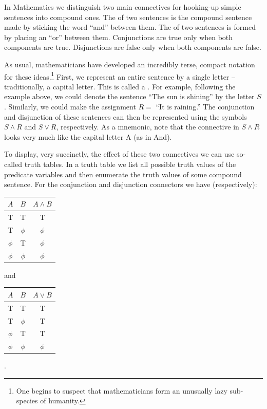 In Mathematics we distinguish two main connectives for hooking-up simple
sentences into compound ones.  The  
of two sentences is
the compound sentence made by sticking the word ``and'' between them.
The  of two sentences is 
formed by placing an ``or'' 
between them.  Conjunctions are true only when both components are true.
Disjunctions are false only when both components are false.


As usual, mathematicians have developed an incredibly terse, compact
notation for these ideas.\footnote{One begins to suspect that %
mathematicians form an unusually lazy sub-species of humanity.}  
First, we represent an
entire sentence by a single letter -- traditionally, a capital letter.  
This is called a .
For example, following the example above, we could denote the sentence
``The sun is shining'' by the letter $S$.   Similarly, we could make the
assignment $R =$ ``It is raining.''   The conjunction and disjunction 
of these sentences can then be represented using the symbols $S \land R$
and $S \lor R$, respectively.  As a mnemonic, note that the connective
in $S \land R$ looks very much like the capital letter A (as in And).

To display, very succinctly, the effect of these two connectives we can
use so-called truth tables. In a truth table we list 
all possible truth 
values of the predicate variables and then enumerate the truth values 
of some compound sentence.  For the conjunction and disjunction
connectors we have (respectively):

\begin{center}
\begin{tabular}{c|c||c}
\; $A$ \; & \; $B$ \; & \; $A \land B$ \; \\ \hline
T & T & T \\
T & $\phi$ & $\phi$\\
 $\phi$ & T & $\phi$\\
 $\phi$ &  $\phi$ & $\phi$\\
\end{tabular}
\hspace{.25in}and\hspace{.25in}
\begin{tabular}{c|c||c}
\; $A$ \; & \; $B$ \; & \; $A \lor B$ \; \\ \hline
T & T & T \\
T & $\phi$ & T\\
 $\phi$ & T & T\\
 $\phi$ &  $\phi$ & $\phi$\\
\end{tabular}.
\end{center}

